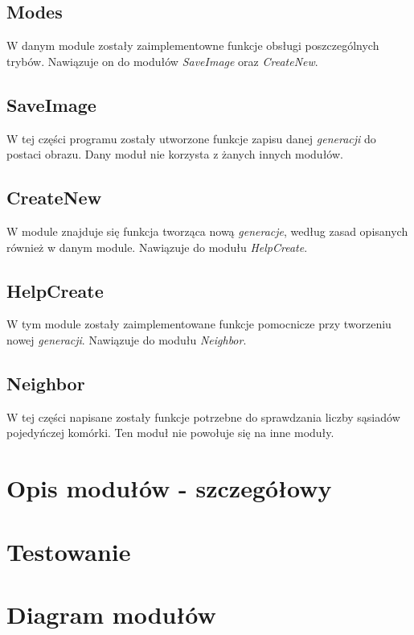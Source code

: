 \documentclass{article}
\begin{document}
\subsection{Modes}

\quad W danym module zosta\l{}y zaimplementowne funkcje obs\l{}ugi poszczeg\'olnych tryb\'ow. 
Nawi\k{a}zuje on do modu\l{}\'ow \textit{SaveImage} oraz \textit{CreateNew}. 

\subsection{SaveImage}

\quad W tej cz\k{e}\'sci programu zosta\l{}y utworzone funkcje zapisu danej \textit{generacji} do postaci obrazu. 
Dany modu\l{} nie korzysta z \.zanych innych modu\l{}\'ow.

\subsection{CreateNew}

\quad W module znajduje si\k{e} funkcja tworz\k{a}ca now\k{a} \textit{generacje}, wed\l{}ug zasad opisanych r\'ownie\.z w danym module.
Nawi\k{a}zuje do modu\l{}u \textit{HelpCreate}.

\subsection{HelpCreate}

\quad W tym module zosta\l{}y zaimplementowane funkcje pomocnicze przy tworzeniu nowej \textit{generacji}.
Nawi\k{a}zuje do modu\l{}u \textit{Neighbor}.

\subsection{Neighbor}

\quad W tej cz\k{e}\'sci napisane zosta\l{}y funkcje potrzebne do sprawdzania liczby s\k{a}siad\'ow pojedy\'nczej kom\'orki.
Ten modu\l{} nie powo\l{}uje si\k{e} na inne modu\l{}y.

\section{Opis modu\l{}\'ow - szczeg\'o\l{}owy}


\section{Testowanie}


\section{Diagram modu\l{}\'ow}
\end{document}
